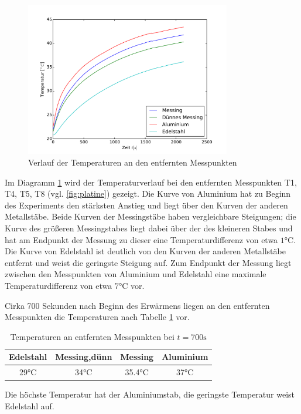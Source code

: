 \begin{figure}[p]
	\label{fig:entftemp}
	\centering
	\includegraphics[width=0.8\textwidth]{Bilder/M1_Tempverl.pdf}
	\caption{Verlauf der Temperaturen an den entfernten Messpunkten}
\end{figure}
Im Diagramm \ref{fig:entftemp} wird der Temperaturverlauf bei den entfernten Messpunkten T1, T4, T5, T8 (vgl. \ref{fig:platine}) gezeigt. 
Die Kurve von Aluminium hat zu Beginn des Experiments den stärksten Anstieg und liegt über den Kurven der anderen Metallstäbe. 
Beide Kurven der Messingstäbe haben vergleichbare Steigungen;
die Kurve des größeren Messingstabes liegt dabei über der des kleineren Stabes und hat am Endpunkt der Messung zu dieser eine Temperaturdifferenz von etwa $1 \si{\degreeCelsius}$. 
Die Kurve von Edelstahl ist deutlich von den Kurven der anderen Metallstäbe entfernt und weist die geringste Steigung auf. 
Zum Endpunkt der Messung liegt zwischen den Messpunkten von Aluminium und Edelstahl eine maximale Temperaturdifferenz von etwa $7 \si{\degreeCelsius}$ vor. 

Cirka 700 Sekunden nach Beginn des Erwärmens liegen an den entfernten Messpunkten die Temperaturen nach Tabelle \ref{tab:700} vor. 
\begin{table}[h!]
\centering
\begin{tabular}{cccc}
	\toprule
	{Edelstahl}&{Messing,dünn}&{Messing}&{Aluminium}\\
	\midrule
	29$\si{\degreeCelsius}$& 34$\si{\degreeCelsius}$& 35.4$\si{\degreeCelsius}$& 37$\si{\degreeCelsius}$\\
	\bottomrule
\end{tabular}
\label{tab:700}
\caption{Temperaturen an entfernten Messpunkten bei $t=700\si{\second}$}
\end{table}
Die höchste Temperatur hat der Aluminiumstab, die geringste Temperatur weist Edelstahl auf.

